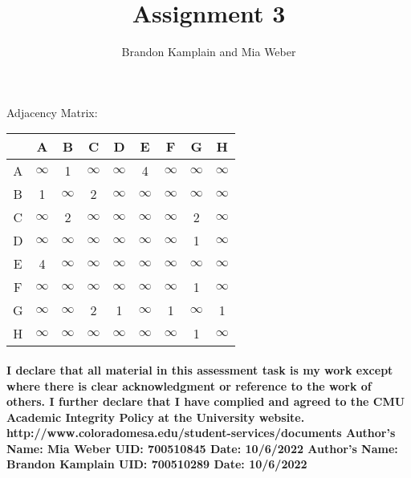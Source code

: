 \documentclass{article}
\begin{document}
\title{Assignment 3}
\author{Brandon Kamplain and Mia Weber}

\maketitle
\newpage

\begin{center}
\noindent Adjacency Matrix:

\begin{tabular}{c || c | c | c | c | c | c | c | c|} 
 & A & B & C & D & E & F & G & H \\  [0.5ex] 
 \hline\hline
 A & $\infty$ & 1 & $\infty$ & $\infty$ & 4 & $\infty$ & $\infty$ & $\infty$ \\ 
 \hline
 B & 1 & $\infty$ & 2 & $\infty$ & $\infty$ & $\infty$ & $\infty$ & $\infty$ \\
 \hline
 C & $\infty$ & 2 & $\infty$ & $\infty$ & $\infty$ & $\infty$ & 2 & $\infty$ \\
 \hline
 D & $\infty$ & $\infty$ & $\infty$ & $\infty$ & $\infty$ & $\infty$ & 1 & $\infty$ \\
 \hline
 E & 4 & $\infty$ & $\infty$ & $\infty$ & $\infty$ & $\infty$ & $\infty$ & $\infty$ \\ 
  \hline
 F & $\infty$ & $\infty$ & $\infty$ & $\infty$ & $\infty$ & $\infty$ & 1 & $\infty$ \\ 
  \hline
 G & $\infty$ & $\infty$ & 2 & 1 & $\infty$ & 1 & $\infty$ & 1 \\
  \hline
 H & $\infty$ & $\infty$ & $\infty$ & $\infty$ & $\infty$ & $\infty$ & 1 & $\infty$ \\  [1ex] 
 \hline
\end{tabular}
\end{center}

\paragraph{\linebreak I declare that all material in this assessment task is my work except where there is clear acknowledgment or reference to the work of others. I further declare that I have complied and agreed to the CMU Academic Integrity Policy at the University website.
\linebreak  http://www.coloradomesa.edu/student-services/documents
\linebreak \linebreak Author’s Name: Mia Weber UID: 700510845 Date: 10/6/2022
\linebreak Author's Name: Brandon Kamplain UID: 700510289 Date: 10/6/2022}
\end{document}
